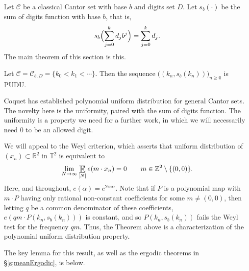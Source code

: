 Let $ \mathcal{C}$ be a classical Cantor set with base $b$ and  digits set $ D$. 
Let $s_b(\cdot)$ be the sum of digits function with base $b$, that is, 
\begin{equation} \label{e:sumofdigits}
s_b\Bigl( \sum_{j=0}^k d_j b^j\Bigr) = 
\sum_{j=0}^k  d_j.  
\end{equation}
The main theorem of this section is this. 

\begin{theorem} \label{t:polyUniform}
Let $\mathcal C = \mathcal C _{b, D} =\{k_0< k_1 < \cdots \}$. 
Then the sequence $\bigl( (k_n, s_b(k_n) )\bigr)_{n\geq 0} $ is PUDU.  
\end{theorem}

Coquet \cites{MR506123,MR578819} has established polynomial uniform distribution for general Cantor sets. The novelty here is the uniformity, paired with the sum of digits function.  The uniformity is a property we need for a further work, in which we will necessarily need $0$ to be an allowed digit. 


We will appeal to the Weyl criterion, which asserts that uniform distribution of $(x_n) \subset \mathbb{R} ^2 $ in $\mathbb{T} ^2 $ is equivalent to 
\begin{equation} \label{eWeyl}
    \lim_{N\to \infty} \Expectation _{[N]}  e(m \cdot x_n) =0 
    \qquad m\in \mathbb{Z} ^2 \setminus \{(0,0)\}. 
\end{equation}
Here, and throughout,  $e ( \alpha ) = e^{2 \pi i \alpha }$.  
Note that if $P$ is a polynomial map with $m\cdot P$ having only rational non-constant coefficients for some $m\neq(0,0)$, then  
letting $q$ be a common denominator of these coefficients, $e(qm\cdot P(k_n, s_b(k_n)))$ is constant, and so $P(k_n,s_b(k_n))$ fails the Weyl test for the frequency $qm$.  
Thus, the Theorem above is a characterization of the polynomial uniform distribution property. 

 
The key lemma for this result, as well as the ergodic theorems in \S\ref{s;meanErgodic}, is below. 

